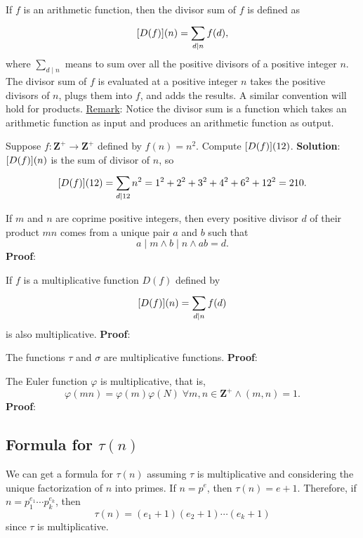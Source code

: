 \begin{Definition}{}{}
    If $ f $ is an arithmetic function, then the divisor sum of $ f $ is defined as
    \[ [D(f)](n)=\sum_{d\mid n}^{}f(d), \]
    where $ \sum_{d\mid n}^{} $ means to sum over all the positive divisors of a positive integer $ n $.
    The divisor sum of $ f $ is evaluated at a positive integer $ n $ takes the positive divisors of $ n $,
    plugs them into $ f $, and adds the results. A similar convention will hold for products.
    \tcblower{}
    \underline{Remark}: Notice the divisor sum is a function which takes an arithmetic function as input and produces
    an arithmetic function as output.
\end{Definition}
\begin{Example}{}{}
    Suppose $ f\colon\mathbf{Z}^+\to\mathbf{Z}^+ $ defined by $ f(n)=n^2 $. Compute $ [D(f)](12) $.
    \tcblower{}
    \textbf{Solution}: $ [D(f)](n) $ is the sum of divisor of $ n $, so
    \[ [D(f)](12)=\sum_{d\mid 12}^{}n^2=1^2+2^2+3^2+4^2+6^2+12^2=210. \]
\end{Example}
\begin{Proposition}{}{}
    If $ m $ and $ n $ are coprime positive integers, then every positive divisor
    $ d $ of their product $ mn $ comes from a unique pair $ a $ and $ b $ such that
    \[ a\mid m\land b\mid n\land ab=d. \]
    \tcblower{}
    \textbf{Proof}:
\end{Proposition}
\begin{Theorem}{}{}
    If $ f $ is a multiplicative function $ D(f) $ defined by
    \[ [D(f)](n)=\sum_{d\mid n}^{}f(d) \]
    is also multiplicative.
    \tcblower{}
    \textbf{Proof}:
\end{Theorem}
\begin{Proposition}{}{}
    The functions $ \tau $ and $ \sigma $ are multiplicative functions.
    \tcblower{}
    \textbf{Proof}:
\end{Proposition}
\begin{Theorem}{}{}
    The Euler function $ \varphi $ is multiplicative, that is,
    \[ \varphi(mn)=\varphi(m)\varphi(N)\;\forall m,n\in\mathbf{Z}^+\land (m,n)=1. \]
    \tcblower{}
    \textbf{Proof}:
\end{Theorem}

\subsection*{Formula for $ \tau(n) $}
We can get a formula for $ \tau(n) $
assuming $ \tau $ is multiplicative and considering the unique factorization of $ n $ into primes.
If $ n=p^e $, then $ \tau(n)=e+1 $. Therefore, if $ n=p_1^{e_1}\cdots p_k^{e_k} $, then
\[ \tau(n)=(e_1+1)(e_2+1)\cdots(e_k+1) \]
since $ \tau $ is multiplicative.

